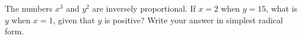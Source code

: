 The numbers $x^3$ and $y^2$ are inversely proportional. If $x=2$ when $y=15$, what is $y$ when $x=1$, given that $y$ is positive? Write your answer in simplest radical form.
